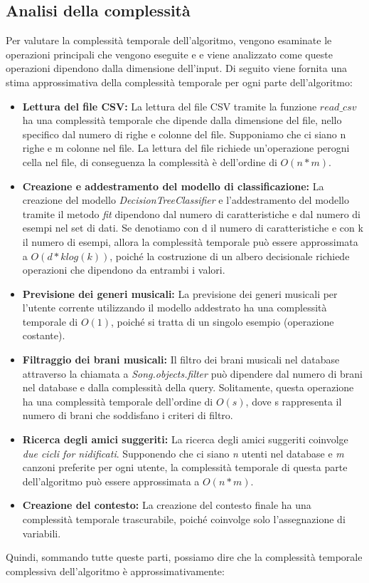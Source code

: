 \subsection{Analisi della complessità}
Per valutare la complessità temporale dell'algoritmo, vengono esaminate le operazioni principali che 
vengono eseguite e e viene analizzato come queste operazioni dipendono dalla dimensione dell'input. 
Di seguito viene fornita una stima approssimativa della complessità temporale per ogni parte dell'algoritmo:
\begin{itemize}
    \item \textbf{Lettura del file CSV:} La lettura del file CSV tramite la funzione $read\_csv$ ha una 
        complessità temporale che dipende dalla dimensione del file, nello specifico dal numero di righe e colonne del file.
        Supponiamo che ci siano n righe e m colonne nel file. La lettura del file richiede un'operazione 
        perogni cella nel file, di conseguenza la complessità è dell'ordine 
        di ${O(n*m)}$.
    \item \textbf{Creazione e addestramento del modello di classificazione:} La creazione del modello 
        \textit{DecisionTreeClassifier} e l'addestramento del modello tramite il metodo \textit{fit} dipendono dal numero di 
        caratteristiche e dal numero di esempi nel set di dati. Se denotiamo con d il numero di caratteristiche 
        e con k il numero di esempi, allora la complessità temporale può essere approssimata a $O(d * k log(k))$, 
        poiché la costruzione di un albero decisionale richiede operazioni che dipendono da entrambi i valori.
    \item \textbf{Previsione dei generi musicali:} La previsione dei generi musicali per l'utente corrente 
        utilizzando il modello addestrato ha una complessità temporale di ${O(1)}$, poiché si tratta di un singolo esempio
        (operazione costante).
    \item \textbf{Filtraggio dei brani musicali:} Il filtro dei brani musicali nel database attraverso la chiamata 
        a \textit{Song.objects.filter} può dipendere dal numero di brani nel database e dalla complessità della query. 
        Solitamente, questa operazione ha una complessità temporale dell'ordine di ${O(s)}$, dove s rappresenta il 
        numero di brani che soddisfano i criteri di filtro.
    \item \textbf{Ricerca degli amici suggeriti:} La ricerca degli amici suggeriti coinvolge \textit{due cicli for nidificati}. 
        Supponendo che ci siano \textit{n} utenti nel database e \textit{m} canzoni preferite per ogni utente, la complessità temporale di questa
        parte dell'algoritmo può essere approssimata a $O(n * m)$.
    \item \textbf{Creazione del contesto:} La creazione del contesto finale ha una complessità temporale trascurabile, 
        poiché coinvolge solo l'assegnazione di variabili.
    
     
\end{itemize}
Quindi, sommando tutte queste parti, possiamo dire che la complessità temporale complessiva dell'algoritmo è approssimativamente:

